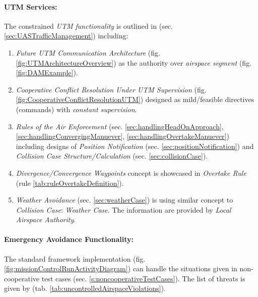\paragraph{UTM Services:} The constrained \emph{UTM functionality} is outlined in (sec. \ref{sec:UASTrafficManagement}) including:
\begin{enumerate}
    \item \emph{Future UTM Communication Architecture} (fig. \ref{fig:UTMArchitectureOverview}) as the authority over \emph{airspace segment} (fig. \ref{fig:DAMExample})\cite{gerdes2016dynamic}.
    
    \item \emph{Cooperative Conflict Resolution Under UTM Supervision} (fig. \ref{fig:CooperativeConflictResolutionUTM}) designed as mild/feasible directives (commands) with \emph{constant supervision}.
    
    \item \emph{Rules of the Air Enforcement} (sec. \ref{sec:handlingHeadOnApproach}, \ref{sec:handlingConvergingManuever}, \ref{sec:handlingOvertakeManuever}) including designs of \emph{Position Notification} (sec. \ref{sec:positionNotification}) and \emph{Collision Case Structure/Calculation} (sec. \ref{sec:collisionCase}).
    
    \item \emph{Divergence/Convergence Waypoints} concept is showcased in \emph{Overtake Rule} (rule \ref{tab:ruleOvertakeDefinition}). 
    
    \item \emph{Weather Avoidance} (sec. \ref{sec:weatherCase}) is using similar concept to \emph{Collision Case}: \emph{Weather Case}. The information are provided by \emph{Local Airspace Authority}.
    
\end{enumerate}

\paragraph{Emergency Avoidance Functionality:}  The standard framework implementation (fig. \ref{fig:missionControlRunActivityDiagram}) can handle the situations given in non-cooperative test cases (sec. \ref{s:noncooperativeTestCases}). The list of threats is given by (tab. \ref{tab:uncontrolledAirspaceViolations}). 

